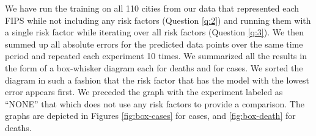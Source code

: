 \documentclass[12pt]{article}
\theoremstyle{definition}
\renewcommand{\_}{%
    \textunderscore\hspace{0pt}%
}
\begin{document}

We have run the training on all 110 cities from our data that
represented each FIPS while not including any risk factors (Question
\ref{q:2}) and running them with a single risk factor while iterating
over all risk factors (Question \ref{q:3}). We then summed up all
absolute errors for the predicted data points over the same time
period and repeated each experiment 10 times. We summarized all the
results in the form of a box-whisker diagram each for deaths and for
cases. We sorted the diagram in such a fashion that the risk factor
that has the model with the lowest error appears first. We preceded
the graph with the experiment labeled as ``NONE'' that which does not
use any risk factors to provide a comparison. The graphs are depicted
in Figures \ref{fig:box-cases} for cases, and \ref{fig:box-death} for
deaths.
\end{document}
